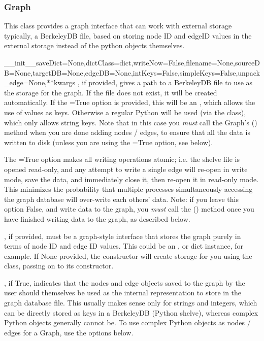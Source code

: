 \documentclass{howto}
\begin{document}
\subsubsection{Graph}
This class provides a graph interface that can work with external storage
typically, a BerkeleyDB file, based on storing node ID and
edgeID values in the external storage instead of the python objects themselves.
\begin{funcdesc}{__init__}{saveDict=None,dictClass=dict,writeNow=False,filename=None,sourceDB=None,targetDB=None,edgeDB=None,intKeys=False,simpleKeys=False,unpack_edge=None,**kwargs}
  , if provided, gives a path to a BerkeleyDB file to use as the 
  storage for the graph.  If the file does not exist, it will be created automatically.
  If the =True option is provided, this will be an ,
  which allows the use of  values as keys.  Otherwise a regular Python 
   will be used (via the  class),
  which only allows string keys.  Note that in this case you {\em must} 
  call the Graph's () method when you are done adding nodes / edges,
  to ensure that all the data is written to disk (unless you are using the
  =True option, see below).

  The =True option makes all
  writing operations atomic; i.e. the shelve file is opened read-only, and
  any attempt to write a single edge will re-open in write mode, save the data,
  and immediately close it, then re-open it in read-only mode.  This minimizes
  the probability that multiple processes simultaneously accessing the graph
  database will over-write each others' data.  Note: if you leave this option False,
  and write data to the graph, you {\em must} call the () method
  once you have finished writing data to the graph, as described below.

  , if provided, must be a graph-style interface that stores the graph
  purely in terms of node ID and edge ID values.  This could be an ,
   or dict instance, for example.  If None provided,
  the constructor will create storage for you using the  class, passing
  on  to its constructor.

  , if True, indicates that the nodes and edge objects saved to
  the graph by the user should themselves be used as the internal representation
  to store in the graph database file.  This usually makes sense only for strings
  and integers, which can be directly stored as keys in a BerkeleyDB (Python shelve),
  whereas complex Python objects generally cannot be.  To use complex Python objects
  as nodes / edges for a Graph, use the  options below.


\end{funcdesc}
\end{document}
